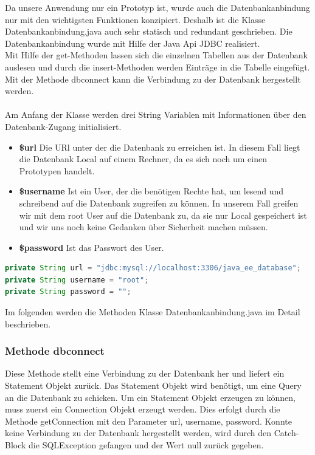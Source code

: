 Da unsere Anwendung nur ein Prototyp ist, wurde auch die Datenbankanbindung nur mit den wichtigsten Funktionen konzipiert. Deshalb ist die Klasse Datenbankanbindung.java auch sehr statisch und redundant geschrieben. 
Die Datenbankanbindung wurde mit Hilfe der Java Api JDBC realisiert.\\
Mit Hilfe der get-Methoden lassen sich die einzelnen Tabellen aus der Datenbank auslesen und durch die insert-Methoden werden Einträge in die Tabelle eingefügt.
Mit der Methode dbconnect kann die Verbindung zu der Datenbank hergestellt werden.\\
\\
Am Anfang der Klasse werden drei String Variablen mit Informationen über den Datenbank-Zugang initialisiert.
\begin{itemize}
	\item \textbf{\$url} Die URl unter der die Datenbank zu erreichen ist. In diesem Fall liegt die Datenbank Local auf einem Rechner, da es sich noch um einen Prototypen handelt.
	\item \textbf{\$username} Ist ein User, der die benötigen Rechte hat, um lesend und schreibend auf die Datenbank zugreifen zu können. In unserem Fall greifen wir mit dem root User auf die Datenbank zu, da sie nur Local gespeichert ist und wir uns noch keine Gedanken über Sicherheit machen müssen.
	\item \textbf{\$password} Ist das Passwort des User. 
\end{itemize}

\begin{lstlisting}[language=JAVA, caption=Datenbankanbindung.java/Datenfelder, firstnumber=30]
private String url = "jdbc:mysql://localhost:3306/java_ee_database";
private String username = "root";
private String password = "";
\end{lstlisting}
\newpage
Im folgenden werden die Methoden Klasse Datenbankanbindung.java im Detail beschrieben.
 
\subsubsection{Methode dbconnect\(\)}
Diese Methode stellt eine Verbindung zu der Datenbank her und liefert ein Statement Objekt zurück. Das Statement Objekt wird benötigt, um eine Query an die Datenbank zu schicken.
Um ein Statement Objekt erzeugen zu können, muss zuerst ein Connection Objekt erzeugt werden. Dies erfolgt durch die Methode getConnection mit den Parameter url, username, password. Konnte keine Verbindung zu der Datenbank hergestellt werden, wird durch den Catch-Block die SQLException gefangen und der Wert null zurück gegeben.

